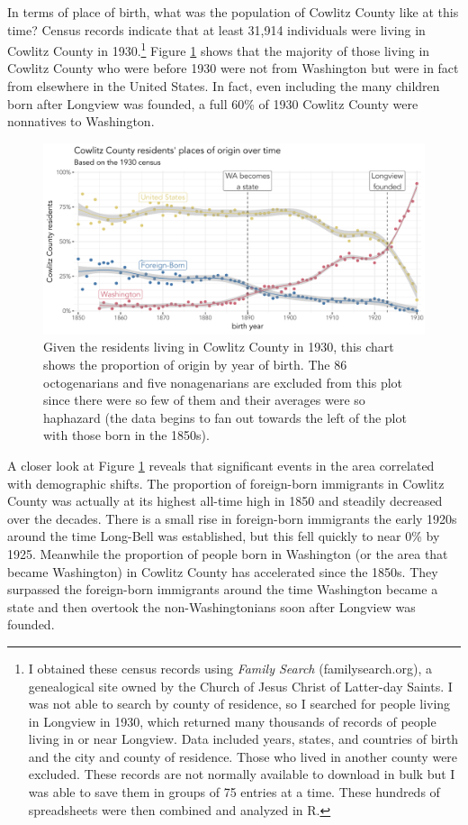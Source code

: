 In terms of place of birth, what was the population of Cowlitz County like at this time? Census records indicate that at least 31,914 individuals were living in Cowlitz County in 1930.\footnote{I obtained these census records using \textit{Family Search} (familysearch.org), a genealogical site owned by the Church of Jesus Christ of Latter-day Saints. I was not able to search by county of residence, so I searched for people living in Longview in 1930, which returned many thousands of records of people living in or near Longview. Data included years, states, and countries of birth and the city and county of residence. Those who lived in another county were excluded. These records are not normally available to download in bulk but I was able to save them in groups of 75 entries at a time. These hundreds of spreadsheets were then combined and analyzed in R.} Figure \ref{fig:census1930} shows that the majority of those living in Cowlitz County who were before 1930 were not from Washington but were in fact from elsewhere in the United States. In fact, even including the many children born after Longview was founded, a full 60\% of 1930 Cowlitz County were nonnatives to Washington.

\begin{figure}[t!]
    \centering
    \includegraphics[width = 6.5in]{Figures/other_figures/origin_1930.pdf}
    \caption[Proportion of Cowlitz County residents by year of birth by origin ]{Given the residents living in Cowlitz County in 1930, this chart shows the proportion of origin by year of birth. The 86 octogenarians and five nonagenarians are excluded from this plot since there were so few of them and their averages were so haphazard (the data begins to fan out towards the left of the plot with those born in the 1850s).}
    \label{fig:census1930}
\end{figure}

A closer look at Figure \ref{fig:census1930} reveals that significant events in the area correlated with demographic shifts. The proportion of foreign-born immigrants in Cowlitz County was actually at its highest all-time high in 1850 and steadily decreased over the decades. There is a small rise in foreign-born immigrants the early 1920s around the time Long-Bell was established, but this fell quickly to near 0\% by 1925. Meanwhile the proportion of people born in Washington (or the area that became Washington) in Cowlitz County has accelerated since the 1850s. They surpassed the foreign-born immigrants around the time Washington became a state and then overtook the non-Washingtonians soon after Longview was founded.

